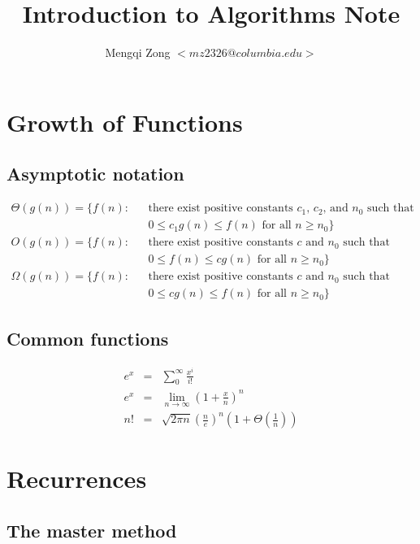 \documentclass[12pt]{article}
\title{Introduction to Algorithms Note}
\author{Mengqi Zong $<mz2326@columbia.edu>$}
\begin{document}
\maketitle

\setlength{\parindent}{0in}

\section{Growth of Functions}

\subsection{Asymptotic notation}

\begin{eqnarray*}
  \Theta (g(n)) = \{ f(n): && \text{there exist positive constants
    $c_1$, $c_2$, and $n_0$ such that} \\
  && 0 \le c_1 g(n) \le f(n) \text{ for all } n \ge n_0 \} \\
  O(g(n)) = \{ f(n): && \text{there exist positive constants
    $c$ and $n_0$ such that} \\
  && 0 \le f(n) \le cg(n) \text{ for all } n \ge n_0 \} \\
  \Omega (g(n)) = \{ f(n): && \text{there exist positive constants
    $c$ and $n_0$ such that} \\
  && 0 \le cg(n) \le f(n) \text{ for all } n \ge n_0 \}
\end{eqnarray*}

\subsection{Common functions}

\begin{eqnarray*}
  e^x &=& \sum_0^{\infty} \frac {x^i}{i!} \\
  e^x &=& \lim_{n \rightarrow \infty} (1 + \frac {x}{n})^n \\
  n!  &=& \sqrt {2 \pi n} \left(\frac {n}{e} \right)^n 
          \left( 1 + \Theta \left( \frac {1}{n} \right) \right)
\end{eqnarray*}

\section{Recurrences}

\subsection{The master method}
\end{document}
